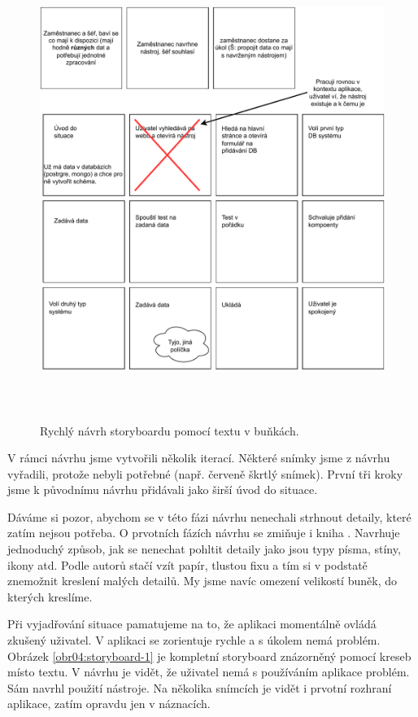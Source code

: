 \begin{figure}[htb]
    \centering
    \includegraphics[height=150mm]{../img/storyboard-1-rychly-navrh}
    \caption{Rychlý návrh storyboardu pomocí textu v buňkách.}
    \label{obr04:storyboard-1-text}
\end{figure}

V rámci návrhu jsme vytvořili několik iterací. Některé snímky jsme z návrhu vyřadili, protože nebyli potřebné (např. červeně škrtlý snímek). První tři kroky jsme k původnímu návrhu přidávali jako širší úvod do situace.

Dáváme si pozor, abychom se v této fázi návrhu nenechali strhnout detaily, které zatím nejsou potřeba. O prvotních fázích návrhu se zmiňuje i kniha \cite{Refactoring_UI}. Navrhuje jednoduchý způsob, jak se nenechat pohltit detaily jako jsou typy písma, stíny, ikony atd. Podle autorů stačí vzít papír, tlustou fixu a tím si v podstatě znemožnit kreslení malých detailů. My jsme navíc omezení velikostí buněk, do kterých kreslíme.

Při vyjadřování situace pamatujeme na to, že aplikaci momentálně ovládá zkušený uživatel. V  aplikaci se zorientuje rychle a s úkolem nemá problém. Obrázek \ref{obr04:storyboard-1} je kompletní storyboard znázorněný pomocí kreseb místo textu. V návrhu je vidět, že uživatel nemá s používáním aplikace problém. Sám navrhl použití nástroje. Na několika snímcích je vidět i prvotní rozhraní aplikace, zatím opravdu jen v náznacích.

